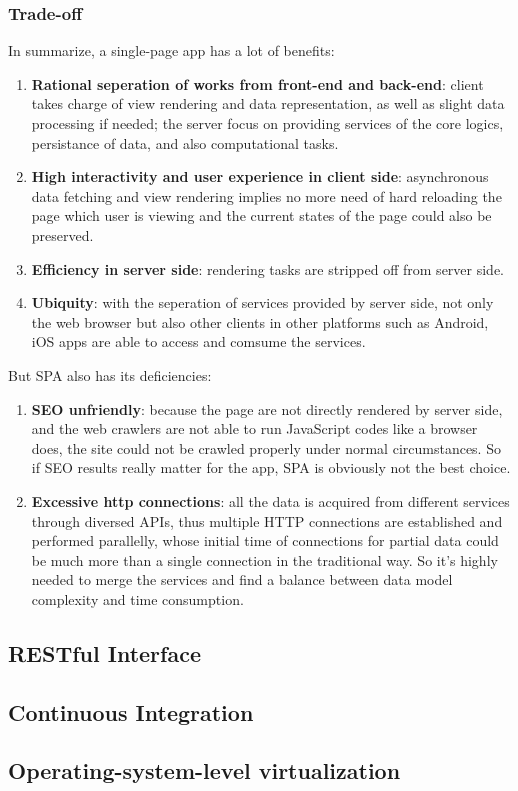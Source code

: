 \subsubsection{Trade-off}
In summarize, a single-page app has a lot of benefits:
\begin{enumerate}
\item
\textbf{Rational seperation of works from front-end and back-end}: client takes charge of view rendering and data representation, as well as slight data processing if needed; the server focus on providing services of the core logics, persistance of data, and also computational tasks.
\item
\textbf{High interactivity and user experience in client side}: asynchronous data fetching and view rendering implies no more need of hard reloading the page which user is viewing and the current states of the page could also be preserved.
\item
\textbf{Efficiency in server side}: rendering tasks are stripped off from server side.
\item
\textbf{Ubiquity}: with the seperation of services provided by server side, not only the web browser but also other clients in other platforms such as Android, iOS apps are able to access and comsume the services.
\end{enumerate}

But SPA also has its deficiencies:

\begin{enumerate}
\item
\textbf{\gls{SEO} unfriendly}: because the page are not directly rendered by server side, and the web crawlers are not able to run JavaScript codes like a browser does, the site could not be crawled properly under normal circumstances. So if SEO results really matter for the app, SPA is obviously not the best choice.
\item
\textbf{Excessive http connections}: all the data is acquired from different services through diversed \gls{API}s, thus multiple HTTP connections are established and performed parallelly, whose initial time of connections for partial data could be much more than a single connection in the traditional way. So it's highly needed to merge the services and find a balance between data model complexity and time consumption.
\end{enumerate}


\subsection{RESTful Interface}



\subsection{Continuous Integration}



\subsection{Operating-system-level virtualization}
